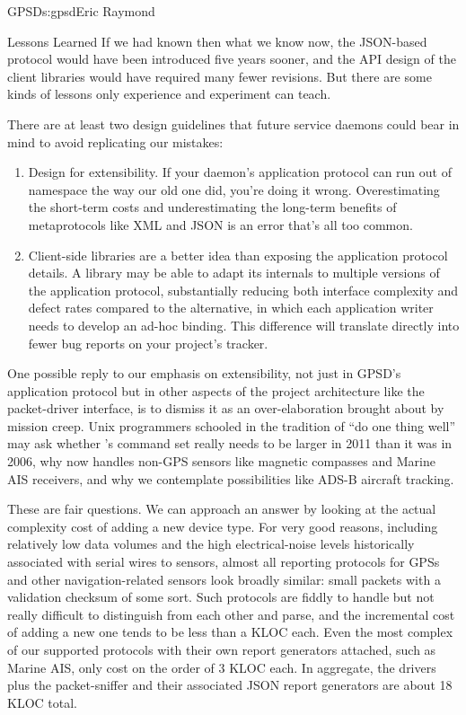 \begin{aosachapter}{GPSD}{s:gpsd}{Eric Raymond}
\begin{aosasect1}{Lessons Learned}
If we had known then what we know now, the JSON-based protocol would
have been introduced five years sooner, and the API design of the
client libraries would have required many fewer revisions. But there
are some kinds of lessons only experience and experiment can teach.

There are at least two design guidelines that future service daemons
could bear in mind to avoid replicating our mistakes:

\begin{enumerate}

  \item Design for extensibility.  If your daemon's application
    protocol can run out of namespace the way our old one did, you're
    doing it wrong. Overestimating the short-term costs and
    underestimating the long-term benefits of metaprotocols like XML
    and JSON is an error that's all too common.

  \item Client-side libraries are a better idea than exposing the
    application protocol details. A library may be able to adapt its
    internals to multiple versions of the application protocol,
    substantially reducing both interface complexity and defect rates
    compared to the alternative, in which each application writer needs to
    develop an ad-hoc binding.  This difference will translate
    directly into fewer bug reports on your project's tracker.

\end{enumerate}

One possible reply to our emphasis on extensibility, not just in
GPSD's application protocol but in other aspects of the project
architecture like the packet-driver interface, is to dismiss it as an
over-elaboration brought about by mission creep.  Unix programmers
schooled in the tradition of ``do one thing well'' may ask whether
's command set really needs to be larger in 2011 than it
was in 2006, why  now handles non-GPS sensors like magnetic
compasses and Marine AIS receivers, and why we contemplate
possibilities like ADS-B aircraft tracking.

These are fair questions. We can approach an answer by looking at the
actual complexity cost of adding a new device type.  For very good
reasons, including relatively low data volumes and the high
electrical-noise levels historically associated with serial wires to
sensors, almost all reporting protocols for GPSs and other
navigation-related sensors look broadly similar: small packets with a
validation checksum of some sort.  Such protocols are fiddly to handle
but not really difficult to distinguish from each other and parse, and
the incremental cost of adding a new one tends to be less than a KLOC
each. Even the most complex of our supported protocols with their own
report generators attached, such as Marine AIS, only cost on the order
of 3 KLOC each. In aggregate, the drivers plus the packet-sniffer and
their associated JSON report generators are about 18 KLOC total.


\end{aosasect1}
\end{aosachapter}
